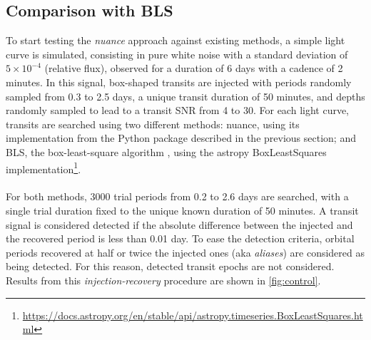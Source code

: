 \documentclass[modern]{aastex631}
\newcommand{\nuancemethod}{\textit{nuance}}
\newcommand{\footlink}[1]{\footnote{\url{#1}}}
\begin{document}
\subsection{Comparison with BLS}\label{control}

To start testing the \nuancemethod{} approach against existing methods, a simple light curve is simulated, consisting in pure white noise with a standard deviation of $5\times 10^{-4}$ (relative flux), observed for a duration of 6 days with a cadence of 2 minutes.
In this signal, box-shaped transits are injected with periods randomly sampled from 0.3 to 2.5 days, a unique transit duration of 50 minutes, and depths randomly sampled to lead to a transit SNR from 4 to 30.
For each light curve, transits are searched using two different methods: \textsf{nuance}, using its implementation from the Python package described in the previous section; and \textsf{BLS}, the box-least-square algorithm \citep{bls}, using the \textsf{astropy} \textsf{BoxLeastSquares} implementation\footlink{https://docs.astropy.org/en/stable/api/astropy.timeseries.BoxLeastSquares.html}.\\\\
For both methods, 3000 trial periods from 0.2 to 2.6 days are searched, with a single trial duration fixed to the unique known duration of 50 minutes. A transit signal is considered detected if the absolute difference between the injected and the recovered period is less than 0.01 day. To ease the detection criteria, orbital periods recovered at half or twice the injected ones (aka \textit{aliases}) are considered as being detected. For this reason, detected transit epochs are not considered. Results from this \textit{injection-recovery} procedure are shown in \autoref{fig:control}.
\end{document}
